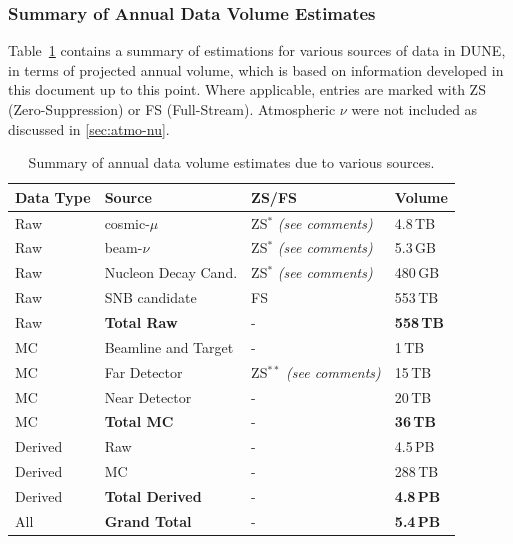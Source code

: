 \subsubsection{Summary of Annual Data Volume Estimates}
Table~\ref{tab:summary-data-table} contains a summary of estimations for various sources
of data in DUNE, in terms of projected annual volume, which is based on information developed in
this document up to this point. Where applicable, entries are marked with ZS (Zero-Suppression) or
FS (Full-Stream). Atmospheric $\nu$ were not included as discussed in \ref{sec:atmo-nu}.
\begin{table}[ht!]
	\centering
	\begin{tabular}{| p{1.2in}| p{1.7in} | p{1.5in} | p{0.65in} |}
		\hline
		\textbf{Data Type} & \textbf{Source} & \textbf{ZS/FS} & \textbf{Volume} \\ \hline
		Raw & cosmic-$\mu$  & ZS$^*$ \textit{(see comments)}& 4.8\,TB \\	\hline
		Raw & beam-$\nu$  & ZS$^*$ \textit{(see comments)}& 5.3\,GB  \\	\hline
		Raw & Nucleon Decay Cand.  & ZS$^*$ \textit{(see comments)}& 480\,GB  \\	\hline
		Raw & SNB candidate & FS & 553\,TB \\	\hline \hline \hline
		Raw & \textbf{Total Raw} & - & \textbf{558\,TB} \\		\hline \hline \hline
		MC & Beamline and Target  & - & 1\,TB \\	\hline
		MC & Far Detector & ZS$^{**}$  \textit{(see comments)}  & 15\,TB \\		\hline
		MC & Near Detector & - &20\,TB \\ \hline \hline \hline
		MC & \textbf{Total MC} & - & \textbf{36\,TB} \\		\hline \hline \hline
		Derived &  Raw  & - & 4.5\,PB \\	\hline
		Derived &  MC  & - & 288\,TB \\	\hline  \hline \hline
		Derived & \textbf{Total Derived} & - & \textbf{4.8\,PB} \\		\hline \hline \hline
		All & \textbf{Grand Total} & - & \textbf{5.4\,PB} \\		\hline %
	\end{tabular}
	\caption{Summary of annual data volume estimates due to various sources.}
	\label{tab:summary-data-table}
\end{table}
